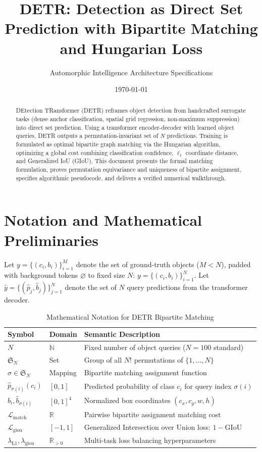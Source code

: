 \documentclass[11pt,a4paper]{article}
\title{DETR: Detection as Direct Set Prediction with Bipartite Matching and Hungarian Loss}
\author{Automorphic Intelligence Architecture Specifications}
\date{\today}
\theoremstyle{definition}
\begin{document}
\maketitle

\begin{abstract}
DEtection TRansformer (DETR) reframes object detection from handcrafted surrogate tasks (dense anchor classification, spatial grid regression, non-maximum suppression) into direct set prediction. Using a transformer encoder-decoder with learned object queries, DETR outputs a permutation-invariant set of $N$ predictions. Training is formulated as optimal bipartite graph matching via the Hungarian algorithm, optimizing a global cost combining classification confidence, $\ell_1$ coordinate distance, and Generalized IoU (GIoU). This document presents the formal matching formulation, proves permutation equivariance and uniqueness of bipartite assignment, specifies algorithmic pseudocode, and delivers a verified numerical walkthrough.
\end{abstract}

\section{Notation and Mathematical Preliminaries}

Let $y = \{(c_i, b_i)\}_{i=1}^M$ denote the set of ground-truth objects ($M < N$), padded with background tokens $\varnothing$ to fixed size $N$: $y = \{(c_i, b_i)\}_{i=1}^N$. Let $\hat{y} = \{(\hat{p}_j, \hat{b}_j)\}_{j=1}^N$ denote the set of $N$ query predictions from the transformer decoder.

\begin{table}[h]
\centering
\caption{Mathematical Notation for DETR Bipartite Matching}
\begin{tabular}{lll}
\toprule
\textbf{Symbol} & \textbf{Domain} & \textbf{Semantic Description} \\
\midrule
$N$ & $\mathbb{N}$ & Fixed number of object queries ($N = 100$ standard) \\
$\mathfrak{S}_N$ & Set & Group of all $N!$ permutations of $\{1, \dots, N\}$ \\
$\sigma \in \mathfrak{S}_N$ & Mapping & Bipartite matching assignment function \\
$\hat{p}_{\sigma(i)}(c_i)$ & $[0, 1]$ & Predicted probability of class $c_i$ for query index $\sigma(i)$ \\
$b_i, \hat{b}_{\sigma(i)}$ & $[0, 1]^4$ & Normalized box coordinates $(c_x, c_y, w, h)$ \\
$\mathcal{L}_{\text{match}}$ & $\mathbb{R}$ & Pairwise bipartite assignment matching cost \\
$\mathcal{L}_{\text{giou}}$ & $[-1, 1]$ & Generalized Intersection over Union loss: $1 - \text{GIoU}$ \\
$\lambda_{\text{L1}}, \lambda_{\text{giou}}$ & $\mathbb{R}_{> 0}$ & Multi-task loss balancing hyperparameters \\
\bottomrule
\end{tabular}
\end{table}
\end{document}
